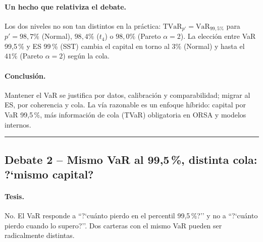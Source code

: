 \documentclass[a4paper,12pt]{article}
\newcommand{\VaR}{\mathrm{VaR}}
\newcommand{\TVaR}{\mathrm{TVaR}}
\begin{document}
\paragraph{Un hecho que relativiza el debate.} Los dos niveles no son tan distintos en la pr\'actica: $\TVaR_{p'}=\VaR_{99,5\%}$ para $p'=98{,}7\%$ (Normal), $98{,}4\%$ ($t_4$) o $98{,}0\%$ (Pareto $\alpha=2$). La elecci\'on entre VaR 99,5\,\% y ES 99\,\% (SST) cambia el capital en torno al $3\%$ (Normal) y hasta el $41\%$ (Pareto $\alpha=2$) seg\'un la cola.

\paragraph{Conclusi\'on.} Mantener el VaR se justifica por datos, calibraci\'on y comparabilidad; migrar al ES, por coherencia y cola. La v\'ia razonable es un enfoque h\'ibrido: capital por VaR 99,5\,\%, m\'as informaci\'on de cola (TVaR) obligatoria en ORSA y modelos internos.

\bigskip\hrule\bigskip

\subsection{Debate 2 -- Mismo VaR al 99,5\,\%, distinta cola: ?`mismo capital?}

\paragraph{Tesis.} No. El VaR responde a ``?`cu\'anto pierdo en el percentil 99,5\,\%?'' y no a ``?`cu\'anto pierdo cuando lo supero?''. Dos carteras con el mismo VaR pueden ser radicalmente distintas.
\end{document}
